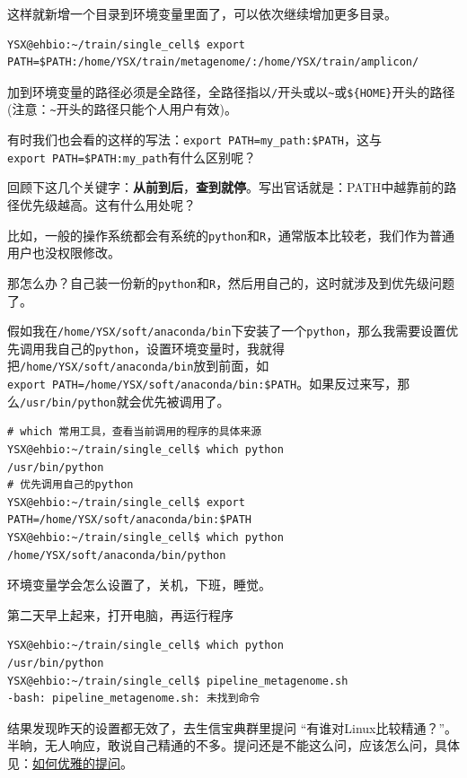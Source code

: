 \documentclass[]{article}
\numberwithin{figure}{section}
\numberwithin{table}{section}
\begin{document}
这样就新增一个目录到环境变量里面了，可以依次继续增加更多目录。

\begin{verbatim}
YSX@ehbio:~/train/single_cell$ export PATH=$PATH:/home/YSX/train/metagenome/:/home/YSX/train/amplicon/
\end{verbatim}

加到环境变量的路径必须是全路径，全路径指以\texttt{/}开头或以\texttt{\textasciitilde{}}或\texttt{\$\{HOME\}}开头的路径 (注意：\texttt{\textasciitilde{}}开头的路径只能个人用户有效)。

有时我们也会看的这样的写法：\texttt{export\ PATH=my\_path:\$PATH}，这与\texttt{export\ PATH=\$PATH:my\_path}有什么区别呢？

回顾下这几个关键字：\textbf{从前到后}，\textbf{查到就停}。写出官话就是：PATH中越靠前的路径优先级越高。这有什么用处呢？

比如，一般的操作系统都会有系统的\texttt{python}和\texttt{R}，通常版本比较老，我们作为普通用户也没权限修改。

那怎么办？自己装一份新的\texttt{python}和\texttt{R}，然后用自己的，这时就涉及到优先级问题了。

假如我在\texttt{/home/YSX/soft/anaconda/bin}下安装了一个\texttt{python}，那么我需要设置优先调用我自己的\texttt{python}，设置环境变量时，我就得把\texttt{/home/YSX/soft/anaconda/bin}放到前面，如\texttt{export\ PATH=/home/YSX/soft/anaconda/bin:\$PATH}。如果反过来写，那么\texttt{/usr/bin/python}就会优先被调用了。

\begin{verbatim}
# which 常用工具，查看当前调用的程序的具体来源
YSX@ehbio:~/train/single_cell$ which python
/usr/bin/python
# 优先调用自己的python
YSX@ehbio:~/train/single_cell$ export PATH=/home/YSX/soft/anaconda/bin:$PATH
YSX@ehbio:~/train/single_cell$ which python
/home/YSX/soft/anaconda/bin/python
\end{verbatim}

环境变量学会怎么设置了，关机，下班，睡觉。

第二天早上起来，打开电脑，再运行程序

\begin{verbatim}
YSX@ehbio:~/train/single_cell$ which python
/usr/bin/python
YSX@ehbio:~/train/single_cell$ pipeline_metagenome.sh
-bash: pipeline_metagenome.sh: 未找到命令
\end{verbatim}

结果发现昨天的设置都无效了，去生信宝典群里提问 ``有谁对Linux比较精通？''。半晌，无人响应，敢说自己精通的不多。提问还是不能这么问，应该怎么问，具体见：\href{https://mp.weixin.qq.com/s/B8JO4GjvzZP5BUMoaKPrZw}{如何优雅的提问}。
\end{document}
